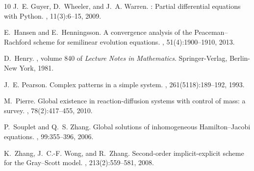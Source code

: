 \documentclass[11pt, a4paper]{amsart}
\numberwithin{equation}{section}
\begin{document}
\begin{thebibliography}{10}
	J.~E. Guyer, D.~Wheeler, and J.~A. Warren.
	: Partial differential equations with {P}ython.
	, 11(3):6--15, 2009.
	
	E.~Hansen and E.~Henningsson.
	\newblock A convergence analysis of the {P}eaceman--{R}achford scheme for
	semilinear evolution equations.
	, 51(4):1900--1910, 2013.
	
	D.~Henry.
	, volume 840
	of {\em Lecture Notes in Mathematics}.
	\newblock Springer-Verlag, Berlin-New York, 1981.
	
	J.~E. Pearson.
	\newblock Complex patterns in a simple system.
	, 261(5118):189--192, 1993.
	
	M.~Pierre.
	\newblock Global existence in reaction-diffusion systems with control of mass:
	a survey.
	, 78(2):417--455, 2010.
	
	P.~Souplet and Q.~S. Zhang.
	\newblock Global solutions of inhomogeneous {H}amilton--{J}acobi equations.
	, 99:355--396, 2006.
	
	K.~Zhang, J.~C.-F. Wong, and R.~Zhang.
	\newblock Second-order implicit-explicit scheme for the {G}ray--{S}cott model.
	, 213(2):559--581, 2008.
	
\end{thebibliography}
\end{document}
